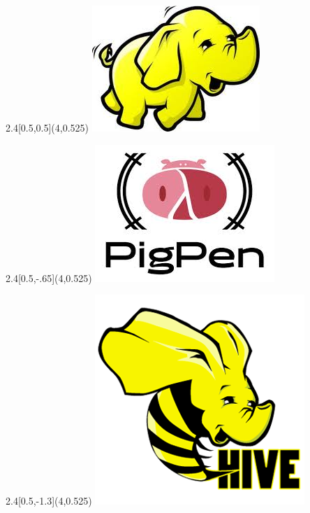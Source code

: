 \documentclass{beamer}
\begin{document}
\begin{frame}

\begin{textblock}{2.4}[0.5,0.5](4,0.525)
\includegraphics[scale=.3]{hadoop.jpeg}
\end{textblock}

\begin{textblock}{2.4}[0.5,-.65](4,0.525)
\includegraphics[scale=.3]{pigpen.jpeg}
\end{textblock}

\begin{textblock}{2.4}[0.5,-1.3](4,0.525)
\includegraphics[scale=.25]{hive.png}
\end{textblock}

\begin{minipage}{7.8cm}


\end{minipage}
\end{frame}
\end{document}
